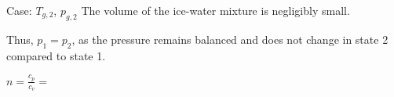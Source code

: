 Case: \( T_{g,2} \), \( p_{g,2} \)  
The volume of the ice-water mixture is negligibly small.  

Thus, \( p_1 = p_2 \), as the pressure remains balanced and does not change in state 2 compared to state 1.  

\( n = \frac{c_p}{c_v} = \)